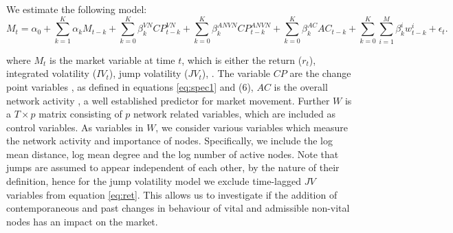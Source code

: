 We estimate the following model: 
\begin{equation}
	\label{eq:ret}
	M_t = \alpha_0 + 
	\sum_{k=1}^{K} \alpha_k M_{t-k} + 
	\sum_{k=0}^{K} \beta^{VN}_k CP_{t-k}^{VN} + 
	\sum_{k=0}^{K} \beta^{ANVN}_k CP_{t-k}^{ANVN} + 
	\sum_{k=0}^{K} \beta^{AC}_k AC_{t-k} + 
	\sum_{k=0}^{K} \sum_{i=1}^{M} \beta^{i}_k w^{i}_{t-k} + \epsilon_t.
\end{equation}
 
where $M_t$ is the market variable at time $t$, which is either the return ($r_t$), integrated volatility ($IV_t$), jump volatility ($JV_t$), . %
The variable $CP$ are the change point variables , as defined in equations \eqref{eq:spec1} and (6), $AC$ is the overall network activity , a well established predictor for market movement. Further $W$ is a $T \times p$ matrix consisting of $p$ network related variables, which are included as control variables. As variables in $W$, we consider various variables which measure the network activity and importance of nodes. Specifically, we include the log mean distance, log mean degree and the log number of active nodes. 
Note that jumps are assumed to appear independent of each other, by the nature of their definition, hence for the jump volatility  model we exclude time-lagged $JV$ variables from equation \ref{eq:ret}. 
This allows us to investigate if the addition of contemporaneous and past changes in behaviour of vital and admissible non-vital nodes has an impact on the market. 

